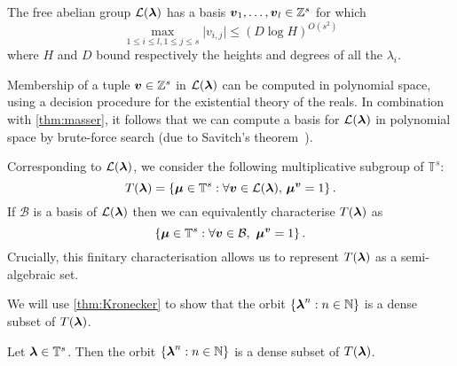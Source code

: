 \begin{theorem}[Masser]
\label{thm:masser}
The free abelian group ${\mathcal{L}}(\boldsymbol{\lambda})$ has a basis $\boldsymbol{v}_1, \ldots, \boldsymbol{v}_{l} \in \mathbb{Z}^{s}$ for which
\[ \max\limits_{1\leq i\leq l,1\leq j\leq s} \lvert v_{i,j} \rvert \leq (D\log H)^{O(s^2)} \]
where $H$ and $D$ bound respectively the heights and degrees of all the $\lambda_{i}$.
\end{theorem}
Membership of a tuple $\boldsymbol{v}\in \mathbb{Z}^{s}$ in ${\mathcal{L}}(\boldsymbol{\lambda})$ can be computed in polynomial space, using a decision procedure for the existential theory of the reals. In combination with \cref{thm:masser}, it follows that we can compute a basis for ${\mathcal{L}}(\boldsymbol{\lambda})$ in polynomial space by brute-force search (due to Savitch's theorem~\cite{Savitch}).

Corresponding to ${\mathcal{L}}(\boldsymbol{\lambda})$, we consider the following
multiplicative subgroup of $\mathbb{T}^{s}$:
\begin{equation*}
T(\boldsymbol{\lambda})=\lbrace \boldsymbol{\mu} \in \mathbb{T}^{s} : \forall \boldsymbol{v} \in {\mathcal{L}}(\boldsymbol{\lambda}), \, \boldsymbol{\mu}^{\boldsymbol{v}} = 1 \rbrace \, .
\end{equation*}
If $\mathcal{B}$ is a basis of ${\mathcal{L}}(\boldsymbol{\lambda})$ then we can
equivalently characterise $T(\boldsymbol{\lambda})$ as
\begin{equation*}
\lbrace \boldsymbol{\mu} \in \mathbb{T}^{s}: \forall \boldsymbol{v} \in \mathcal{B}, \, \, \boldsymbol{\mu}^{\boldsymbol{v}} = 1 \rbrace \, .
\end{equation*}
Crucially, this finitary characterisation allows us to represent $T(\boldsymbol\lambda)$ as a semi-algebraic set.

We will use \cref{thm:Kronecker} to show that the orbit $\lbrace 
\boldsymbol\lambda^n : n\in\mathbb{N} \rbrace$ is a dense subset of
$T(\boldsymbol{\lambda})$.

\begin{theorem}
\label{dense}
Let $\boldsymbol{\lambda}\in\mathbb{T}^s$. Then the orbit $\lbrace \boldsymbol\lambda^n : n\in\mathbb{N} \rbrace$ is a dense subset of $T(\boldsymbol{\lambda})$.
\end{theorem}

